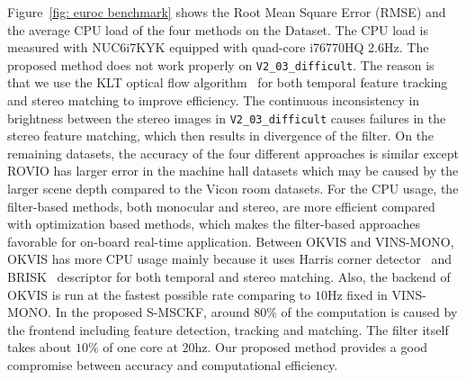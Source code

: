 Figure~\ref{fig: euroc benchmark} shows the Root Mean Square Error (RMSE) and the average CPU load of the four methods on the Dataset. The CPU load is measured with NUC6i7KYK equipped with quad-core i76770HQ 2.6Hz. The proposed method does not work properly on \verb!V2_03_difficult!. The reason is that we use the KLT optical flow algorithm~\cite{lucas1981iterative} for both temporal feature tracking and stereo matching to improve efficiency. The continuous inconsistency in brightness between the stereo images in \verb!V2_03_difficult! causes failures in the stereo feature matching, which then results in divergence of the filter. On the remaining datasets, the accuracy of the four different approaches is similar except ROVIO has larger error in the machine hall datasets which may be caused by the larger scene depth compared to the Vicon room datasets. 
For the CPU usage, the filter-based methods, both monocular and stereo, are more efficient compared with optimization based methods, which makes the filter-based approaches favorable for on-board real-time application. Between OKVIS and VINS-MONO, OKVIS has more CPU usage mainly because it uses Harris corner detector~\cite{harris1988combined} and BRISK~\cite{leutenegger2011brisk} descriptor for both temporal and stereo matching. Also, the backend of OKVIS is run at the fastest possible rate comparing to $10$Hz fixed in VINS-MONO. In the proposed S-MSCKF, around $80\%$ of the computation is caused by the frontend including feature detection, tracking and matching. The filter itself takes about $10\%$ of one core at $20$hz. Our proposed method provides a good compromise between accuracy and computational efficiency. 